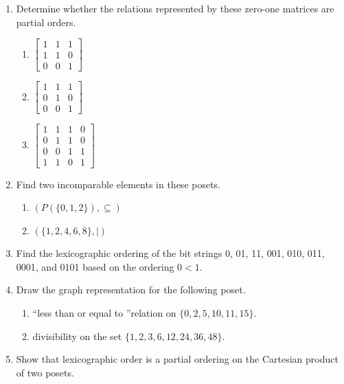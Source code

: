 \documentclass{../../cls/sig-alternate-05-2015}
\begin{document}
\begin{enumerate}
\item Determine whether the relations represented by these
zero-one matrices are partial orders.
\begin{enumerate}
	\item 
	$\begin{bmatrix}
		1 & 1 & 1\\
		1 & 1 & 0\\
		0 & 0 & 1
	\end{bmatrix}$
	\item 
	$\begin{bmatrix}
		1 & 1 & 1\\
		0 & 1 & 0\\
		0 & 0 & 1
	\end{bmatrix}$
	\item 
	$\begin{bmatrix}
		1 & 1 & 1 & 0\\
		0 & 1 & 1 & 0\\
		0 & 0 & 1 & 1\\
		1 & 1 & 0 & 1
	\end{bmatrix}$
\end{enumerate}

\item Find two incomparable elements in these posets.
\begin{enumerate}
	\item $(P(\{0, 1, 2\}), \subseteq)$
	\item $(\{1, 2, 4, 6, 8\}, |)$
\end{enumerate}

\item Find the lexicographic ordering of the bit strings 0, 01,
11, 001, 010, 011, 0001, and 0101 based on the ordering
$0 < 1$.

\item Draw the graph representation for the following poset.
	\begin{enumerate}
		\item \textquotedblleft less than or equal to \textquotedblright relation on $\{0, 2, 5, 10, 11, 15\}.$
		\item divisibility on the set $\{1, 2, 3, 6, 12, 24, 36, 48\}$.
	\end{enumerate}

\item Show that lexicographic order is a partial ordering on the
Cartesian product of two posets.


\end{enumerate}
\end{document}
